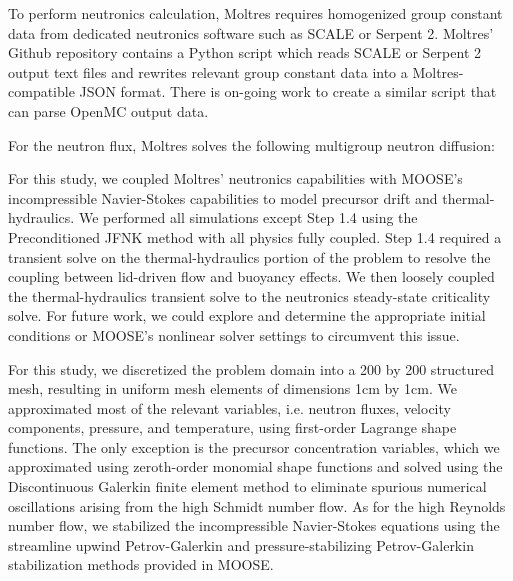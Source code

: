 To perform neutronics calculation, Moltres requires homogenized group constant
data from dedicated neutronics software such as SCALE or Serpent 2. Moltres' 
Github repository contains a Python script which reads SCALE or Serpent 2
output text files and rewrites relevant group constant data into a
Moltres-compatible JSON format. There is on-going work to create a similar
script that can parse OpenMC output data.

For the neutron flux, Moltres solves the following multigroup neutron
diffusion:
%


For this study, we coupled Moltres'
neutronics capabilities with \gls{MOOSE}'s incompressible Navier-Stokes
capabilities \cite{peterson_overview_2017} to
model precursor drift and thermal-hydraulics. We performed all simulations
except Step 1.4 using the Preconditioned \gls{JFNK} method with all physics
fully coupled. Step 1.4 required a transient solve on the thermal-hydraulics
portion of the problem to resolve the coupling between lid-driven flow and
buoyancy effects. We then loosely coupled the thermal-hydraulics transient
solve to the neutronics steady-state criticality solve. For future work, we
could explore and determine the appropriate initial conditions or \gls{MOOSE}'s
nonlinear solver settings to circumvent this issue.

For this study, we discretized the problem domain into a 200 by 200 structured
mesh, resulting in uniform mesh elements of dimensions 1cm by 1cm. We
approximated most of the relevant variables, i.e. neutron fluxes, velocity
components, pressure, and temperature, using first-order Lagrange shape
functions. The only exception is the precursor concentration variables, which
we approximated using zeroth-order monomial shape functions and solved using
the Discontinuous Galerkin finite element method to eliminate spurious
numerical oscillations arising from the high Schmidt number flow. As for the
high Reynolds number flow, we stabilized the incompressible Navier-Stokes
equations using the streamline upwind Petrov-Galerkin and pressure-stabilizing
Petrov-Galerkin stabilization methods \cite{peterson_overview_2017} provided in
\gls{MOOSE}.